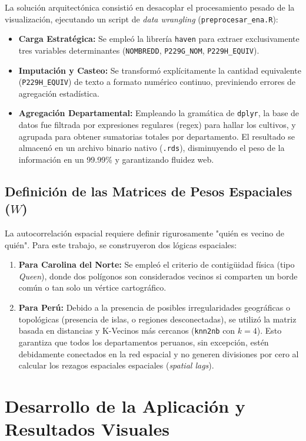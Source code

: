 \documentclass[12pt,a4paper]{article}
\begin{document}
La solución arquitectónica consistió en desacoplar el procesamiento pesado de la visualización, ejecutando un script de \textit{data wrangling} (\texttt{preprocesar\_ena.R}):
\begin{itemize}
    \item \textbf{Carga Estratégica:} Se empleó la librería \texttt{haven} para extraer exclusivamente tres variables determinantes (\texttt{NOMBREDD}, \texttt{P229G\_NOM}, \texttt{P229H\_EQUIV}).
    \item \textbf{Imputación y Casteo:} Se transformó explícitamente la cantidad equivalente (\texttt{P229H\_EQUIV}) de texto a formato numérico continuo, previniendo errores de agregación estadística.
    \item \textbf{Agregación Departamental:} Empleando la gramática de \texttt{dplyr}, la base de datos fue filtrada por expresiones regulares (regex) para hallar los cultivos, y agrupada para obtener sumatorias totales por departamento. El resultado se almacenó en un archivo binario nativo (\texttt{.rds}), disminuyendo el peso de la información en un 99.99\% y garantizando fluidez web.
\end{itemize}

\subsection{Definición de las Matrices de Pesos Espaciales ($W$)}
La autocorrelación espacial requiere definir rigurosamente "quién es vecino de quién". Para este trabajo, se construyeron dos lógicas espaciales:
\begin{enumerate}
    \item \textbf{Para Carolina del Norte:} Se empleó el criterio de contigüidad física (tipo \textit{Queen}), donde dos polígonos son considerados vecinos si comparten un borde común o tan solo un vértice cartográfico.
    \item \textbf{Para Perú:} Debido a la presencia de posibles irregularidades geográficas o topológicas (presencia de islas, o regiones desconectadas), se utilizó la matriz basada en distancias y K-Vecinos más cercanos (\texttt{knn2nb} con $k=4$). Esto garantiza que todos los departamentos peruanos, sin excepción, estén debidamente conectados en la red espacial y no generen divisiones por cero al calcular los rezagos espaciales espaciales (\textit{spatial lags}).
\end{enumerate}

\section{Desarrollo de la Aplicación y Resultados Visuales}
\end{document}
